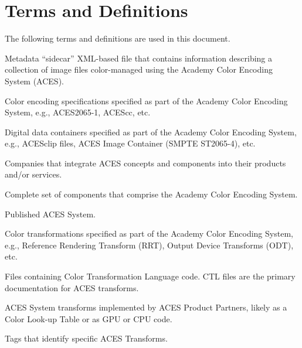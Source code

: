 \numberedformat
\chapter{Terms and Definitions}
The following terms and definitions are used in this document.

Metadata “sidecar” XML-based file that contains information describing a collection of image files color-managed using the Academy Color Encoding System (ACES).

Color encoding specifications specified as part of the Academy Color Encoding System, e.g., ACES2065-1, ACEScc, etc.

Digital data containers specified as part of the Academy Color Encoding System, e.g., ACESclip files, ACES Image Container (SMPTE ST2065-4), etc.

Companies that integrate ACES concepts and components into their products and/or services.

Complete set of components that comprise the Academy Color Encoding System.

Published ACES System.

Color transformations specified as part of the Academy Color Encoding System, e.g., Reference Rendering Transform (RRT), Output Device Transforms (ODT), etc.

Files containing Color Transformation Language code. CTL files are the primary documentation for ACES transforms.

ACES System transforms implemented by ACES Product Partners, likely as a Color Look-up Table or as GPU or CPU code.

Tags that identify specific ACES Transforms.